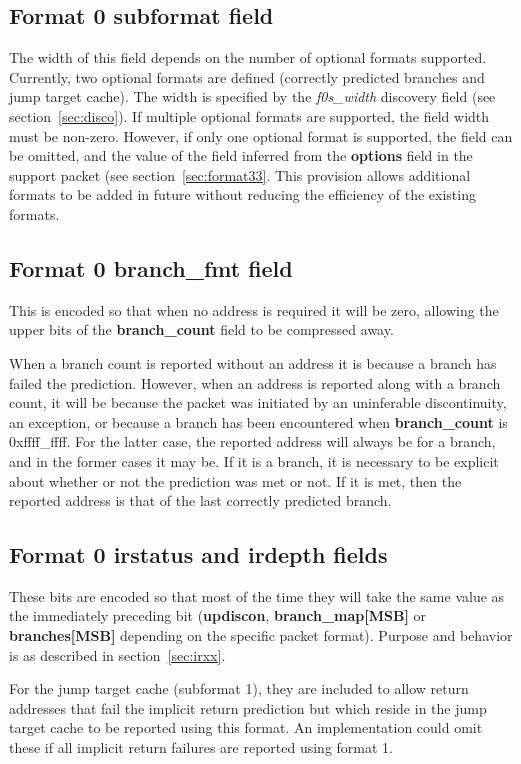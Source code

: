 \subsection{Format 0 subformat field} \label{sec:f0s}

The width of this field depends on the number of optional formats supported.  Currently, two optional formats are
defined (correctly predicted branches and jump target cache).  The width is specified by the 
\textit{f0s\_width} discovery field (see section~\ref{sec:disco}).  If multiple optional formats are supported, the field
width must be non-zero.  However, if only one optional format is supported, the field can be 
omitted, and the value of the field inferred from the \textbf{options} field in the support packet (see section~\ref{sec:format33}.  
This provision allows additional formats to be added in future without reducing the efficiency of the existing formats.

\subsection{Format 0 \textbf{branch\_fmt} field}

This is encoded so that when no address is required it will be zero, allowing the upper bits of the \textbf{branch\_count} 
field to be compressed away.

When a branch count is reported without an address it is because a branch has failed the prediction.  However, when an address is 
reported along with a branch count, it will be because the packet was initiated by an uninferable discontinuity, an exception, or 
because a branch has been encountered when \textbf{branch\_count} is 0xffff\_ffff.  For the latter case, the 
reported address will always be for a branch, and in the former cases it may be.  If it is a branch, 
it is necessary to be explicit about whether or not the prediction was met or not.  If it is met, then the reported address is 
that of the last correctly predicted branch.

\subsection{Format 0 \textbf{irstatus} and \textbf{irdepth} fields}
These bits are encoded so that most of the time they will take the same value as the immediately preceding bit
(\textbf{updiscon}, \textbf{branch\_map[MSB]} or \textbf{branches[MSB]} depending on the specific packet format).  
Purpose and behavior is as described in section~\ref{sec:irxx}.

For the jump target cache (subformat 1), they are included to allow return addresses that fail the implicit return 
prediction but which reside in the jump target cache to be reported using this format.  An implementation
could omit these if all implicit return failures are reported using format 1.





